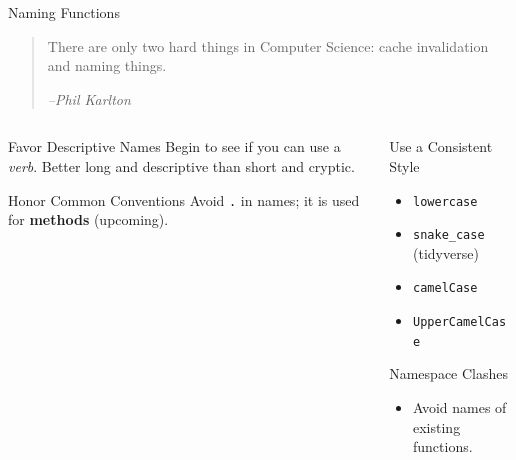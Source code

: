 \documentclass[
  ignorenonframetext,
  aspectratio=1610,
  onlytextwidth]{beamer}
\providecommand{\tightlist}{}
\begin{document}
\begin{frame}[fragile]{Naming Functions}
\label{naming-functions}
\begin{quote}
There are only two hard things in Computer Science: cache invalidation
and naming things.

\medskip

\hfill\emph{--Phil Karlton}
\end{quote}

\pause

\begin{columns}[T]
\begin{column}{0.47\linewidth}
\begin{block}{Favor Descriptive Names}
\label{favor-descriptive-names}
Begin to see if you can use a \emph{verb}. Better long and descriptive
than short and cryptic.

\pause
\end{block}

\begin{block}{Honor Common Conventions}
\label{honor-common-conventions}
Avoid \texttt{.} in names; it is used for \textbf{methods} (upcoming).

\pause
\end{block}
\end{column}

\begin{column}{0.47\linewidth}
\begin{block}{Use a Consistent Style}
\label{use-a-consistent-style}
\begin{itemize}
\tightlist
\item
  \texttt{lowercase}
\item
  \texttt{snake\_case} (tidyverse)
\item
  \texttt{camelCase}
\item
  \texttt{UpperCamelCase}
\end{itemize}

\pause
\end{block}

\begin{block}{Namespace Clashes}
\label{namespace-clashes}
\begin{itemize}
\tightlist
\item
  Avoid names of existing functions.
\end{itemize}
\end{block}
\end{column}
\end{columns}
\end{frame}
\end{document}

